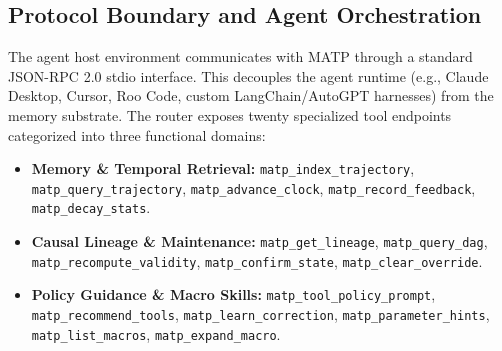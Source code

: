 \documentclass[10pt,journal,compsoc]{IEEEtran}
\begin{document}
\subsection{Protocol Boundary and Agent Orchestration}
The agent host environment communicates with MATP through a standard JSON-RPC 2.0 stdio interface. This decouples the agent runtime (e.g., Claude Desktop, Cursor, Roo Code, custom LangChain/AutoGPT harnesses) from the memory substrate. The router exposes twenty specialized tool endpoints categorized into three functional domains:
\begin{itemize}
    \item \textbf{Memory \& Temporal Retrieval:} \texttt{matp\_index\_trajectory}, \texttt{matp\_query\_trajectory}, \texttt{matp\_advance\_clock}, \texttt{matp\_record\_feedback}, \texttt{matp\_decay\_stats}.
    \item \textbf{Causal Lineage \& Maintenance:} \texttt{matp\_get\_lineage}, \texttt{matp\_query\_dag}, \texttt{matp\_recompute\_validity}, \texttt{matp\_confirm\_state}, \texttt{matp\_clear\_override}.
    \item \textbf{Policy Guidance \& Macro Skills:} \texttt{matp\_tool\_policy\_prompt}, \texttt{matp\_recommend\_tools}, \texttt{matp\_learn\_correction}, \texttt{matp\_parameter\_hints}, \texttt{matp\_list\_macros}, \texttt{matp\_expand\_macro}.
\end{itemize}
\end{document}
